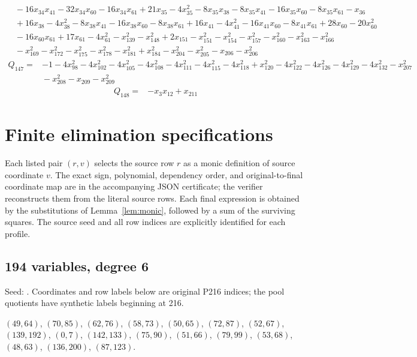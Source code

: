 \documentclass[11pt]{article}
\theoremstyle{definition}\newtheorem{definition}[theorem]{Definition}
\newcommand{\code}[1]{\texttt{\detokenize{#1}}}
\begin{document}
{\begin{align*}
 &{}-16x_{34}x_{41} -32x_{34}x_{60} -16x_{34}x_{61} +21x_{35} -4x_{35}^{2} -8x_{35}x_{38} -8x_{35}x_{41} -16x_{35}x_{60} -8x_{35}x_{61} -x_{36}\\
 &{}+16x_{38} -4x_{38}^{2} -8x_{38}x_{41} -16x_{38}x_{60} -8x_{38}x_{61} +16x_{41} -4x_{41}^{2} -16x_{41}x_{60} -8x_{41}x_{61} +28x_{60} -20x_{60}^{2}\\
 &{}-16x_{60}x_{61} +17x_{61} -4x_{61}^{2} -x_{139}^{2} -x_{148}^{2} +2x_{151} -x_{151}^{2} -x_{154}^{2} -x_{157}^{2} -x_{160}^{2} -x_{163}^{2} -x_{166}^{2}\\
 &{}-x_{169}^{2} -x_{172}^{2} -x_{175}^{2} -x_{178}^{2} -x_{181}^{2} +x_{184}^{2} -x_{204}^{2} -x_{205}^{2} -x_{206} -x_{206}^{2}
\end{align*}
\begin{align*}
 Q_{147}={}&-1 -4x_{98}^{2} -4x_{102}^{2} -4x_{105}^{2} -4x_{108}^{2} -4x_{111}^{2} -4x_{115}^{2} -4x_{118}^{2} +x_{120}^{2} -4x_{122}^{2} -4x_{126}^{2} -4x_{129}^{2} -4x_{132}^{2} -x_{207}^{2}\\
 &{}-x_{208}^{2} -x_{209} -x_{209}^{2}
\end{align*}
\begin{align*}
 Q_{148}={}&-x_{3}x_{12} +x_{211}
\end{align*}
}


\section{Finite elimination specifications}\label{app:pivots}

Each listed pair $(r,v)$ selects the source row $r$ as a monic definition
of source coordinate $v$. The exact sign, polynomial, dependency order,
and original-to-final coordinate map are in the accompanying JSON
certificate; the verifier reconstructs them from the literal source
rows. Each final expression is obtained by the substitutions of
Lemma~\ref{lem:monic}, followed by a sum of the surviving squares.
The source seed and all row indices are explicitly identified for each
profile.

\subsection*{194 variables, degree 6}
Seed: \code{source211.json}. Coordinates and row labels below are original P216 indices; the pool quotients have synthetic labels beginning at 216.
{\small\raggedright
$(49,64)$, $(70,85)$, $(62,76)$, $(58,73)$, $(50,65)$, $(72,87)$, $(52,67)$, $(139,192)$, $(0,7)$, $(142,133)$, $(75,90)$, $(51,66)$, $(79,99)$, $(53,68)$, $(48,63)$, $(136,200)$, $(87,123)$.\par}
\end{document}
